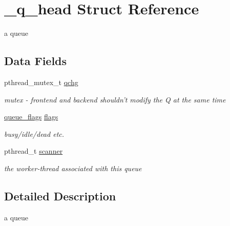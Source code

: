\hypertarget{struct__q__head}{
\section{\_\-q\_\-head Struct Reference}
\label{struct__q__head}
}
a queue  


\subsection*{Data Fields}
\begin{CompactItemize}
\item 
\hypertarget{struct__q__head_o0}{
pthread\_\-mutex\_\-t \hyperlink{struct__q__head_o0}{qchg}}
\label{struct__q__head_o0}

\begin{CompactList}\small\item\em mutex - frontend and backend shouldn't modify the Q at the same time \item\end{CompactList}\item 
\hypertarget{struct__q__head_o1}{
\hyperlink{model_8h_a148}{queue\_\-flags} \hyperlink{struct__q__head_o1}{flags}}
\label{struct__q__head_o1}

\begin{CompactList}\small\item\em busy/idle/dead etc. \item\end{CompactList}\item 
\hypertarget{struct__q__head_o2}{
pthread\_\-t \hyperlink{struct__q__head_o2}{scanner}}
\label{struct__q__head_o2}

\begin{CompactList}\small\item\em the worker-thread associated with this queue \item\end{CompactList}\end{CompactItemize}


\subsection{Detailed Description}
a queue 

